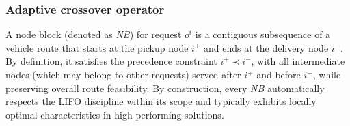 \documentclass[pdflatex]{sn-jnl}
\begin{document}
\subsubsection{Adaptive crossover operator}
\label{sec:adap_cross}




    
    
    




A node block (denoted as \textit{NB}) for request \(o^i\) is a contiguous subsequence of a vehicle route that starts at the pickup node \(i^+\) and ends at the delivery node \(i^-\). By definition, it satisfies the precedence constraint \(i^+ \prec i^-\), with all intermediate nodes (which may belong to other requests) served after \(i^+\) and before \(i^-\), while preserving overall route feasibility. By construction, every \textit{NB} automatically respects the LIFO discipline within its scope and typically exhibits locally optimal characteristics in high-performing solutions.
\end{document}
